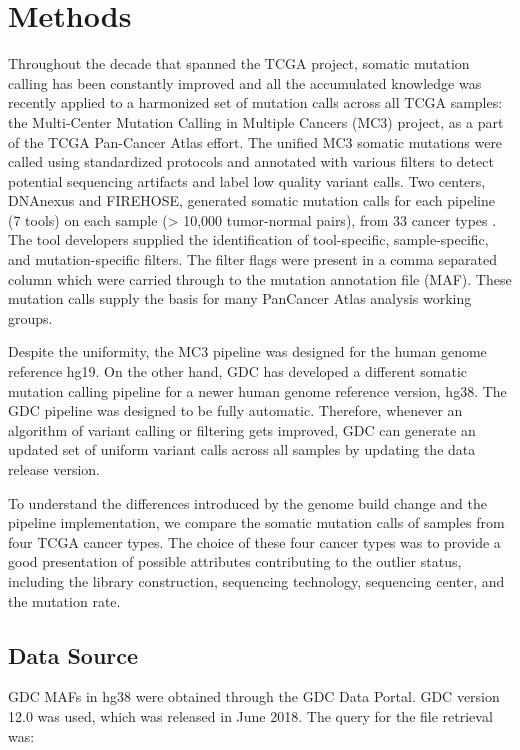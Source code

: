 \section{Methods}
Throughout the decade that spanned the TCGA project, somatic mutation calling has been constantly improved and all the accumulated knowledge was recently applied to a harmonized set of mutation calls across all TCGA samples: the Multi-Center Mutation Calling in Multiple Cancers (MC3) project, as a part of the TCGA Pan-Cancer Atlas effort. The unified MC3 somatic mutations were called using standardized protocols and annotated with various filters to detect potential sequencing artifacts and label low quality variant calls. Two centers, DNAnexus and FIREHOSE, generated somatic mutation calls for each pipeline (7 tools) on each sample (> 10,000 tumor-normal pairs), from 33 cancer types \cite{ellrottk_tcga:MC3MutationCalling2018}. The tool developers supplied the identification of tool-specific, sample-specific, and mutation-specific filters. The filter flags were present in a comma separated column which were carried through to the mutation annotation file (MAF). These mutation calls supply the basis for many PanCancer Atlas analysis working groups.

Despite the uniformity, the MC3 pipeline was designed for the human genome reference hg19. On the other hand, GDC has developed a different somatic mutation calling pipeline for a newer human genome reference version, hg38. The GDC pipeline was designed to be fully automatic. Therefore, whenever an algorithm of variant calling or filtering gets improved, GDC can generate an updated set of uniform variant calls across all samples by updating the data release version.

To understand the differences introduced by the genome build change and the pipeline implementation, we compare the somatic mutation calls of samples from four TCGA cancer types. The choice of these four cancer types was to provide a good presentation of possible attributes contributing to the outlier status, including the library construction, sequencing technology, sequencing center, and the mutation rate.

\subsection{Data Source}
GDC MAFs in hg38 were obtained through the GDC Data Portal. GDC version 12.0 was used, which was released in June 2018. The query for the file retrieval was:

